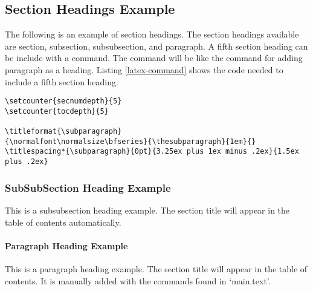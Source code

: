 \subsection{Section Headings Example}

The following is an example of section headings. The section headings available are section, subsection, subsubsection, and paragraph. A fifth section heading can be include with a command. The command will be like the command for adding paragraph as a heading. Listing \ref{latex-command} shows the code needed to include a fifth section heading.

\vspace{0.25cm}

\begin{lstlisting}[language=TEX,caption=LaTeX Command,label=latex-command]
\setcounter{secnumdepth}{5}
\setcounter{tocdepth}{5}

\titleformat{\subparagraph}
{\normalfont\normalsize\bfseries}{\thesubparagraph}{1em}{}
\titlespacing*{\subparagraph}{0pt}{3.25ex plus 1ex minus .2ex}{1.5ex plus .2ex}
\end{lstlisting}

\subsubsection{SubSubSection Heading Example}

This is a subsubsection heading example. The section title will appear in the table of contents automatically.

\paragraph{Paragraph Heading Example}

This is a paragraph heading example. The section title will appear in the table of contents. It is manually added with the commands found in `main.text'.
